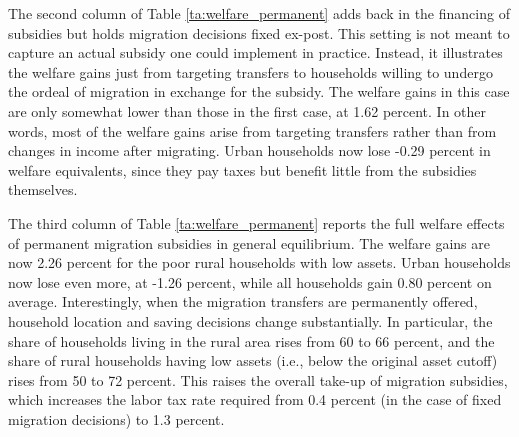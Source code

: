 \documentclass[12pt,pdftex]{article}
\begin{document}
The second column of Table \ref{ta:welfare_permanent} adds back in the financing of subsidies but holds migration decisions fixed ex-post. This setting is not meant to capture an actual subsidy one could implement in practice. Instead, it illustrates the welfare gains just from targeting transfers to households willing to undergo the ordeal of migration in exchange for the subsidy. The welfare gains in this case are only somewhat lower than those in the first case, at 1.62 percent. In other words, most of the welfare gains arise from targeting transfers rather than from changes in income after migrating. Urban households now lose -0.29 percent in welfare equivalents, since they pay taxes but benefit little from the subsidies themselves.

The third column of Table \ref{ta:welfare_permanent} reports the full welfare effects of permanent migration subsidies in general equilibrium. The welfare gains are now 2.26 percent for the poor rural households with low assets. Urban households now lose even more, at -1.26 percent, while all households gain 0.80 percent on average. Interestingly, when the migration transfers are permanently offered, household location and saving decisions change substantially. In particular, the share of households living in the rural area rises from 60 to 66 percent, and the share of rural households having low assets (i.e., below the original asset cutoff) rises from 50 to 72 percent. This raises the overall take-up of migration subsidies, which increases the labor tax rate required from 0.4 percent (in the case of fixed migration decisions) to 1.3 percent.
\end{document}
